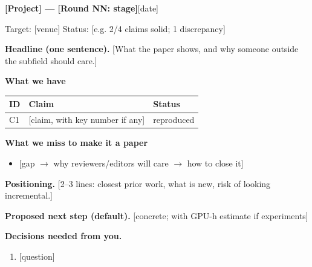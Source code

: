 \documentclass[10pt]{article}
\newcommand{\fillme}[1]{\textcolor{bad}{[#1]}}
\newcommand{\st}[1]{\textsf{\footnotesize #1}}          %
\newcommand{\sok}{\textcolor{ok}{\st{reproduced}}}
\begin{document}
{\large\textbf{\fillme{Project} --- \fillme{Round NN: stage}}}\hfill \fillme{date}\par
\small Target: \fillme{venue} \quad Status: \fillme{e.g. 2/4 claims solid; 1 discrepancy}\par\medskip

\textbf{Headline (one sentence).} \fillme{What the paper shows, and why someone outside the subfield should care.}

\medskip\textbf{What we have}\par
\begin{tabularx}{\linewidth}{@{}l X l@{}}
\toprule
ID & Claim & Status \\ \midrule
C1 & \fillme{claim, with key number if any} & \sok \\
\bottomrule
\end{tabularx}

\medskip\textbf{What we miss to make it a paper}
\begin{itemize}
  \item \fillme{gap $\to$ why reviewers/editors will care $\to$ how to close it}
\end{itemize}

\medskip\textbf{Positioning.} \fillme{2--3 lines: closest prior work, what is new, risk of looking incremental.}

\medskip\textbf{Proposed next step (default).} \fillme{concrete; with GPU-h estimate if experiments}

\medskip\textbf{Decisions needed from you.}
\begin{enumerate}
  \item \fillme{question}
\end{enumerate}
\end{document}
